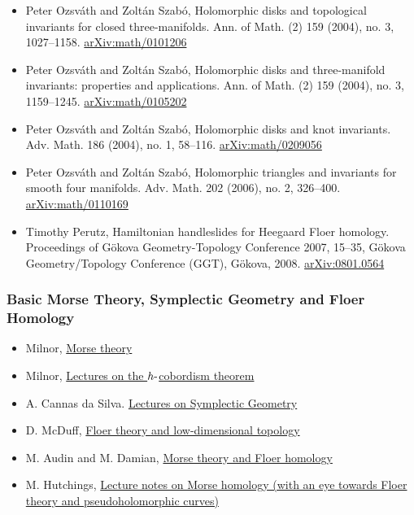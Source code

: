 \begin{itemize}
\tightlist
\item
  \autocite{OSz04a} Peter Ozsváth and Zoltán Szabó, Holomorphic disks
  and topological invariants for closed three-manifolds. Ann. of Math.
  (2) 159 (2004), no. 3, 1027--1158.
  \href{https://arxiv.org/abs/math/0101206}{arXiv:math/0101206}
\item
  \autocite{OSz04b} Peter Ozsváth and Zoltán Szabó, Holomorphic disks
  and three-manifold invariants: properties and applications. Ann. of
  Math. (2) 159 (2004), no. 3, 1159--1245.
  \href{https://arxiv.org/abs/math/0105202}{arXiv:math/0105202}
\item
  \autocite{OSz04c} Peter Ozsváth and Zoltán Szabó, Holomorphic disks
  and knot invariants. Adv. Math. 186 (2004), no. 1, 58--116.
  \href{https://arxiv.org/abs/math/0209056}{arXiv:math/0209056}
\item
  \autocite{OSz06} Peter Ozsváth and Zoltán Szabó, Holomorphic triangles
  and invariants for smooth four manifolds. Adv. Math. 202 (2006), no.
  2, 326--400.
  \href{https://arxiv.org/abs/math/0110169}{arXiv:math/0110169}
\item
  \autocite{Per08} Timothy Perutz, Hamiltonian handleslides for Heegaard
  Floer homology. Proceedings of Gökova Geometry-Topology Conference
  2007, 15--35, Gökova Geometry/Topology Conference (GGT), Gökova, 2008.
  \href{https://arxiv.org/abs/0801.0564}{arXiv:0801.0564}
\end{itemize}

\hypertarget{basic-morse-theory-symplectic-geometry-and-floer-homology}{%
\subsubsection{Basic Morse Theory, Symplectic Geometry and Floer
Homology}\label{basic-morse-theory-symplectic-geometry-and-floer-homology}}

\begin{itemize}
\tightlist
\item
  \autocite{Mi-1} Milnor,
  \href{https://press.princeton.edu/books/paperback/9780691080086/morse-theory-am-51-volume-51}{Morse
  theory}
\item
  \autocite{Mi-2} Milnor,
  \href{https://press.princeton.edu/books/hardcover/9780691651132/lectures-on-the-h-cobordism-theorem}{Lectures
  on the \(h{\hbox{-}}\)cobordism theorem}
\item
  \autocite{Ca} A. Cannas da Silva.
  \href{https://www.springer.com/gp/book/9783540421955}{Lectures on
  Symplectic Geometry}
\item
  \autocite{Mc} D. McDuff,
  \href{http://www.math.stonybrook.edu/~dusa/floer8.pdf}{Floer theory
  and low-dimensional topology}
\item
  \autocite{AD} M. Audin and M. Damian,
  \href{https://link.springer.com/book/10.1007/978-1-4471-5496-9}{Morse
  theory and Floer homology}
\item
  \autocite{Hu} M. Hutchings,
  \href{https://math.berkeley.edu/~hutching/teach/276-2010/mfp.ps}{Lecture
  notes on Morse homology (with an eye towards Floer theory and
  pseudoholomorphic curves)}
\end{itemize}

